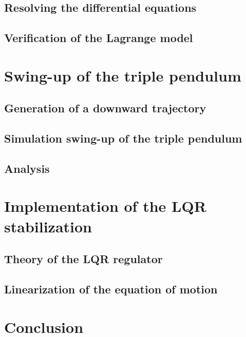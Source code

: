 \documentclass[a4paper,12pt,twoside]{article}
\begin{document}
\subsection{Resolving the differential equations}

\subsection{Verification of the Lagrange model}


\section{Swing-up of the triple pendulum}

\subsection{Generation of a downward trajectory}

\subsection{Simulation swing-up of the triple pendulum}

\subsection{Analysis}

\section{Implementation of the LQR stabilization}
\subsection{Theory of the LQR regulator}

\subsection{Linearization of the equation of motion}
\section{Conclusion}
\end{document}
